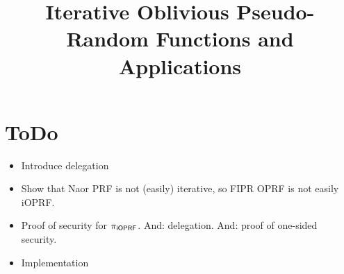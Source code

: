 \documentclass{article}
\begin{document}
\title{Iterative Oblivious Pseudo-Random Functions and Applications}
\author{}\date{}
\maketitle

\section{ToDo}
\begin{itemize}
\item Introduce delegation
\item Show that Naor PRF is not (easily) iterative, so FIPR OPRF is not easily iOPRF.
\item Proof of security for ${\pi_{\mathsf{i}\mathsf{OPRF}}}$. And: delegation. And: proof of one-sided security.
\item Implementation
  
\end{itemize}









\end{document}
